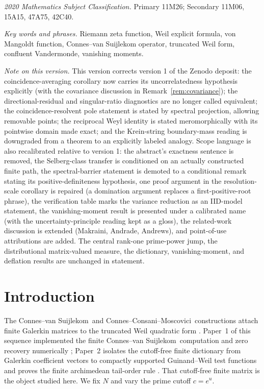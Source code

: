 \documentclass[11pt]{article}
\theoremstyle{plain}
\theoremstyle{definition}
\theoremstyle{remark}
\newcommand{\cvs}{Connes--van Suijlekom}
\newcommand{\ccm}{Connes--Consani--Moscovici}
\begin{document}
\medskip
\noindent\textit{2020 Mathematics Subject Classification.} Primary 11M26;
Secondary 11M06, 15A15, 47A75, 42C40.

\noindent\textit{Key words and phrases.} Riemann zeta function, Weil explicit
formula, von Mangoldt function, Connes--van Suijlekom operator, truncated Weil
form, confluent Vandermonde, vanishing moments.

\medskip
\noindent\textit{Note on this version.} This version corrects version 1 of the
Zenodo deposit: the coincidence-averaging corollary now carries its
uncorrelatedness hypothesis explicitly (with the covariance discussion in
Remark~\ref{rem:covariance}); the directional-residual and singular-ratio
diagnostics are no longer called equivalent; the coincidence-resolvent pole
statement is stated by spectral projection, allowing removable points; the
reciprocal Weyl identity is stated meromorphically with its pointwise domain
made exact; and the Krein-string boundary-mass reading is downgraded from a
theorem to an explicitly labeled analogy. Scope language is also recalibrated
relative to version 1: the abstract's exactness sentence is removed, the
Selberg-class transfer is conditioned on an actually constructed finite path,
the spectral-barrier statement is demoted to a conditional remark stating its
positive-definiteness hypothesis, one proof argument in the resolution-scale
corollary is repaired (a domination argument replaces a first-positive-root
phrase), the verification table marks the variance reduction as an IID-model
statement, the vanishing-moment result is presented under a calibrated name
(with the uncertainty-principle reading kept as a gloss), the related-work
discussion is extended (Makraini, Andrade, Andrews), and point-of-use
attributions are added. The central rank-one prime-power
jump, the distributional matrix-valued measure, the dictionary,
vanishing-moment, and deflation results are unchanged in statement.

\section{Introduction}

The \cvs\ and \ccm\ constructions attach finite Galerkin matrices to the
truncated Weil quadratic form
\cite{ConnesvanSuijlekom2025,ConnesConsaniMoscovici2025}. Paper~1 of this
sequence implemented the finite \cvs\ computation and zero recovery numerically
\cite{Groskin2026Paper1}; Paper~2 isolates the cutoff-free finite dictionary
from Galerkin coefficient vectors to compactly supported Guinand--Weil test
functions and proves the finite archimedean tail-order rule
\cite{Groskin2026FiniteDictionary}. That cutoff-free finite matrix is the object
studied here. We fix $N$ and vary the prime cutoff $c=e^{u}$.
\end{document}

